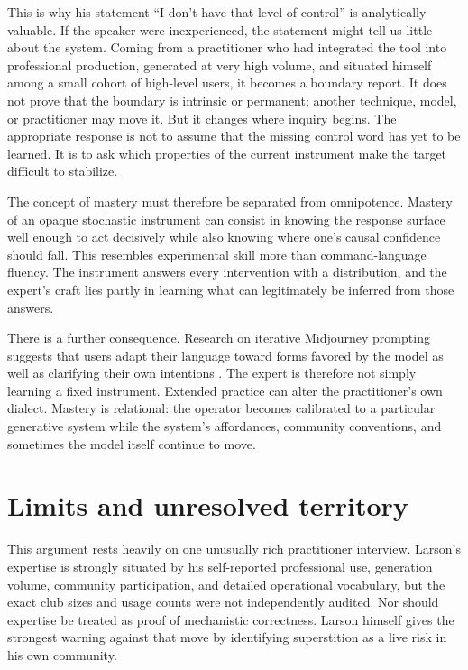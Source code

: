 \documentclass[11pt]{article}
\begin{document}
This is why his statement ``I don't have that level of control'' is analytically valuable. If the speaker were inexperienced, the statement might tell us little about the system. Coming from a practitioner who had integrated the tool into professional production, generated at very high volume, and situated himself among a small cohort of high-level users, it becomes a boundary report. It does not prove that the boundary is intrinsic or permanent; another technique, model, or practitioner may move it. But it changes where inquiry begins. The appropriate response is not to assume that the missing control word has yet to be learned. It is to ask which properties of the current instrument make the target difficult to stabilize.

The concept of mastery must therefore be separated from omnipotence. Mastery of an opaque stochastic instrument can consist in knowing the response surface well enough to act decisively while also knowing where one's causal confidence should fall. This resembles experimental skill more than command-language fluency. The instrument answers every intervention with a distribution, and the expert's craft lies partly in learning what can legitimately be inferred from those answers.

There is a further consequence. Research on iterative Midjourney prompting suggests that users adapt their language toward forms favored by the model as well as clarifying their own intentions \cite{DonYehiyaChoshenAbend2023}. The expert is therefore not simply learning a fixed instrument. Extended practice can alter the practitioner's own dialect. Mastery is relational: the operator becomes calibrated to a particular generative system while the system's affordances, community conventions, and sometimes the model itself continue to move.

\section{Limits and unresolved territory}
This argument rests heavily on one unusually rich practitioner interview. Larson's expertise is strongly situated by his self-reported professional use, generation volume, community participation, and detailed operational vocabulary, but the exact club sizes and usage counts were not independently audited. Nor should expertise be treated as proof of mechanistic correctness. Larson himself gives the strongest warning against that move by identifying superstition as a live risk in his own community.
\end{document}
